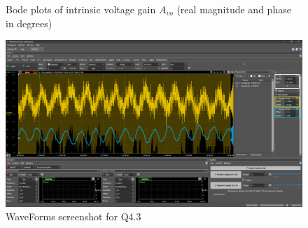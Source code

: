 \documentclass[12pt]{article}
\begin{document}
\begin{itemize}
\begin{figure}[!ht]
        \caption{Bode plots of intrinsic voltage gain $A_{vo}$ (real magnitude and phase in degrees)}
        \label{fig:Step1.7}
    \end{figure}
    \begin{figure}[!ht]
        \centering
        \includegraphics[width=\textwidth]{Q4.3}
        \caption{WaveForms screenshot for Q4.3}
        \label{fig:Q4.3}
    \end{figure}
    \pagebreak

\end{itemize}
\end{document}
